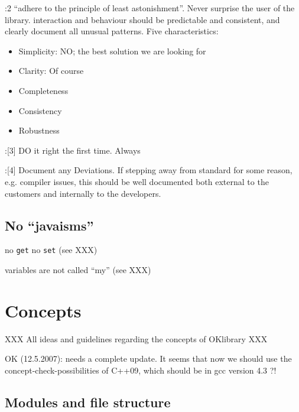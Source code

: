 \documentclass{book}
\newcommand{\name}[1]{\texttt{#1}}
\begin{document}
\cite{OKL_MisfeldtBumgardnerGray2004CppStyle}:2 ``adhere to the principle of least astonishment''. Never surprise the user of the library. interaction and behaviour should be predictable and consistent, and clearly document all unusual patterns. Five characteristics:
\begin{itemize}
\item Simplicity: NO; the best solution we are looking for
\item Clarity: Of course
\item Completeness
\item Consistency
\item Robustness
\end{itemize}

\cite{OKL_MisfeldtBumgardnerGray2004CppStyle}:[3] DO it right the first time. Always

\cite{OKL_MisfeldtBumgardnerGray2004CppStyle}:[4] Document any Deviations. If stepping away from standard for some reason, e.g. compiler issues, this should be well documented both external to the customers and internally to the developers.


\section{No ``javaisms''}
\label{sec:nojavaisms}

no \name{get} no \name{set} (see XXX)

variables are not called ``my'' (see XXX)

\chapter{Concepts}
\label{cha:Concepts}

XXX All ideas and guidelines regarding the concepts of OKlibrary XXX

OK (12.5.2007): needs a complete update. It seems that now we should use the concept-check-possibilities of C++09, which should be in gcc version 4.3 ?!



\section{Modules and file structure}
\label{sec:Modulesfilestructure}
\end{document}
